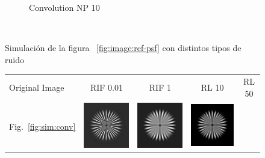 \documentclass{./packages/optica-article}
\begin{document}
\begin{figure}[hbp]
\begin{center}
\begin{subfigure}[t]{0.25\textwidth}
			\caption{Convolution NP 10}
		\end{subfigure}
		\hfill\,
		\caption{Simulación de la figura ~\ref{fig:image:ref-psf} con distintos tipos de ruido}\label{fig:convolutions}
	\end{center}
\end{figure}


\begin{figure}[hbp]
	\centering
	\begin{tabular}[t]{l c c c c}
		Original Image                                                                  & RIF 0.01 & RIF 1 & RL 10 & RL 50 \\
		Fig.~\ref{fig:sim:conv}                                                         &
		\includegraphics[scale=0.25]{Simulation deconvolution/ref_conv/RIF_0.01.png}    &
		\includegraphics[scale=0.25]{Simulation deconvolution/ref_conv/RIF_1.png}       &
		\includegraphics[scale=0.25]{Simulation deconvolution/ref_conv/RL_10.png}       &

\end{tabular}
\end{figure}
\end{document}
